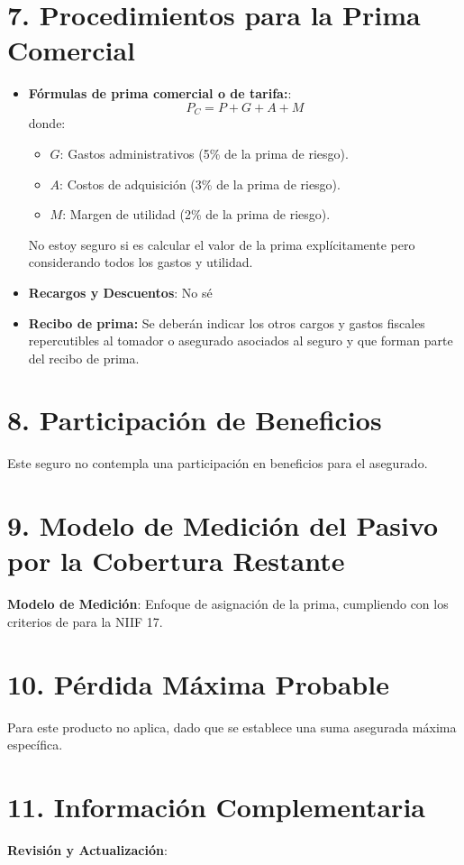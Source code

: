 \documentclass{article}
\begin{document}
	\section*{7. Procedimientos para la Prima Comercial}
	\begin{itemize}
		\item \textbf{Fórmulas de prima comercial o de tarifa:}: 
		\[
		P_C = P + G + A + M
		\]
		donde:
		\begin{itemize}
			\item $G$: Gastos administrativos (5\% de la prima de riesgo).
			\item $A$: Costos de adquisición (3\% de la prima de riesgo).
			\item $M$: Margen de utilidad (2\% de la prima de riesgo).
		\end{itemize}
	No estoy seguro si es calcular el valor de la prima explícitamente pero considerando todos los gastos y utilidad.
		\item \textbf{Recargos y Descuentos}: No sé
		\item  \textbf{Recibo de prima:} Se deberán indicar los otros cargos y gastos fiscales repercutibles al tomador o asegurado asociados al seguro y que forman parte del recibo de prima.
	\end{itemize}
	
	\section*{8. Participación de Beneficios}
	Este seguro no contempla una participación en beneficios para el asegurado.
	
	\section*{9. Modelo de Medición del Pasivo por la Cobertura Restante}
	\textbf{Modelo de Medición}: Enfoque de asignación de la prima, cumpliendo con los criterios de  para la NIIF 17.
	
	\section*{10. Pérdida Máxima Probable}
	Para este producto no aplica, dado que se establece una suma asegurada máxima específica.
	
	\section*{11. Información Complementaria}
	\textbf{Revisión y Actualización}: 
	
\end{document}
